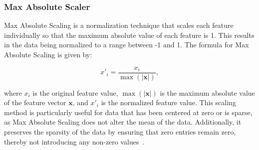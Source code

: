 \subsubsection{Max Absolute Scaler}
Max Absolute Scaling is a normalization technique that scales each feature individually so that the maximum absolute value of each feature is 1.
This results in the data being normalized to a range between -1 and 1.
The formula for Max Absolute Scaling is given by:

$$
x'_i = \frac{x_i}{\max(|\mathbf{x}|)},
$$

where $x_i$ is the original feature value, $\max(|\mathbf{x}|)$ is the maximum absolute value of the feature vector $\mathbf{x}$, and $x'_i$ is the normalized feature value.
This scaling method is particularly useful for data that has been centered at zero or is sparse, as Max Absolute Scaling does not alter the mean of the data.
Additionally, it preserves the sparsity of the data by ensuring that zero entries remain zero, thereby not introducing any non-zero values~\cite{Vasques2024}.